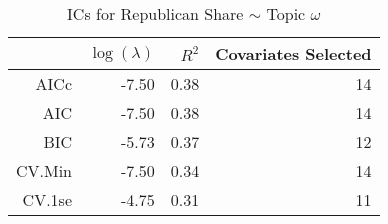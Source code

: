 \begin{table}[ht]
\centering
\begin{tabular}{rrrr}
  \hline
 & $\log(\lambda)$ & $R^2$ & Covariates Selected \\ 
  \hline
AICc & -7.50 & 0.38 &  14 \\ 
  AIC & -7.50 & 0.38 &  14 \\ 
  BIC & -5.73 & 0.37 &  12 \\ 
  CV.Min & -7.50 & 0.34 &  14 \\ 
  CV.1se & -4.75 & 0.31 &  11 \\ 
   \hline
\end{tabular}
\caption{ICs for Republican Share $\sim$ Topic $\omega$} 
\label{tab:topic_repshare}
\end{table}
